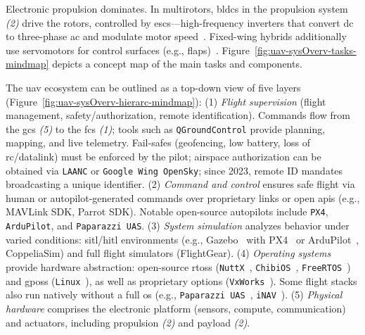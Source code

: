 Electronic propulsion dominates. In multirotors, \glspl{bldc} in the propulsion system \emph{(2)} drive the rotors, controlled by \glspl{esc}—high-frequency inverters that convert \gls{dc} to three-phase \gls{ac} and modulate motor speed~\cite{malyshev_research_2024}. 
Fixed-wing hybrids additionally use servomotors for control surfaces (e.g., flaps)~\cite{gabrielBLDCFixedWingUAV2011}.
Figure~\ref{fig:uav-sysOverv-tasks-mindmap} depicts a concept map of the main tasks and components.

The \gls{uav} ecosystem can be outlined as a top-down view of five layers~\cite{glossner2021overview}
(Figure~\ref{fig:uav-sysOverv-hierarc-mindmap}): 
(1) \emph{Flight supervision} (flight management, safety/authorization, remote identification). Commands flow from the \gls{gcs} \emph{(5)} to the \gls{fcs} \emph{(1)}; tools such as \lstinline|QGroundControl| provide planning, mapping, and live telemetry. 
Fail-safes (geofencing, low battery, loss of \gls{rc}/datalink) must be enforced by the pilot; airspace authorization can be obtained via \lstinline|LAANC| or \lstinline|Google Wing OpenSky|; since 2023, remote ID mandates broadcasting a unique identifier. 
(2) \emph{Command and control} ensures safe flight via human or autopilot-generated commands over proprietary links or open \glspl{api} (e.g., MAVLink SDK, Parrot SDK). Notable open-source autopilots include \lstinline|PX4|, \lstinline|ArduPilot|, and \lstinline|Paparazzi UAS|. 
(3) \emph{System simulation} analyzes behavior under varied conditions: \gls{sitl}/\gls{hitl} environments (e.g., Gazebo~\cite{garcia_simulation_2022} with PX4~\cite{px4-sim} or ArduPilot~\cite{arduPilot-sim}, CoppeliaSim) and full flight simulators (FlightGear). 
(4) \emph{Operating systems} provide hardware abstraction: open-source \glspl{rtos} (\lstinline|NuttX|~\cite{px4-home}, \lstinline|ChibiOS|~\cite{arduPilot-home}, \lstinline|FreeRTOS|~\cite{librePilot-arch}) and \glspl{gpos} (\lstinline|Linux|~\cite{px4-pilotpi}), as well as proprietary options (\lstinline|VxWorks|~\cite{vxWorks-uav-aribus-helionic}). Some flight stacks also run natively without a full \gls{os} (e.g., \lstinline|Paparazzi UAS|~\cite{paparazzi-github}, \lstinline|iNAV|~\cite{inav-github}). 
(5) \emph{Physical hardware} comprises the electronic platform (sensors,
compute, communication) and actuators, including propulsion \emph{(2)} and
payload \emph{(2)}.


